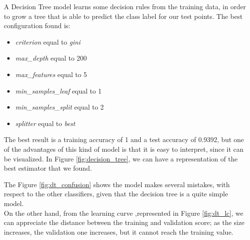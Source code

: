 A Decision Tree model learns some decision rules from the training data, in order to grow a tree that is able to predict the class label for our test points. 
The best configuration found is:
\begin{itemize}
\item \emph{criterion} equal to \emph{gini}
\item \emph{max\_depth} equal to 200
\item \emph{max\_features} equal to 5
\item \emph{min\_samples\_leaf} equal to 1
\item \emph{min\_samples\_split} equal to 2
\item \emph{splitter} equal to \emph{best}
\end{itemize}

The best result is a training accuracy of 1 and a test accuracy of 0.9392, but one of the advantages of this kind of model is that it is easy to interpret, since it can be visualized.
In Figure \ref{fig:decision_tree}, we can have a representation of the best estimator that we found.

The Figure \ref{fig:dt_confusion} shows the model makes several mistakes, with respect to the other classifiers, given that the decision tree is a quite simple model.\\
On the other hand, from the learning curve ,represented in Figure \ref{fig:dt_lc}, we can appreciate the distance between the training and validation score; as the size increases, the validation one increases, but it cannot reach the training value.

